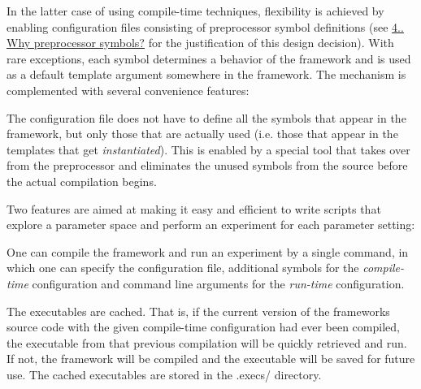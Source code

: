 In the latter case of using compile-\/time techniques, flexibility is achieved by enabling configuration files consisting of preprocessor symbol definitions (see \hyperlink{index_s-why-symbols}{4.. Why preprocessor symbols?} for the justification of this design decision). With rare exceptions, each symbol determines a behavior of the framework and is used as a default template argument somewhere in the framework. The mechanism is complemented with several convenience features\+:


\begin{DoxyItemize}
\item The configuration file does not have to define all the symbols that appear in the framework, but only those that are actually used (i.\+e. those that appear in the templates that get {\itshape instantiated}). This is enabled by a special tool that takes over from the preprocessor and eliminates the unused symbols from the source before the actual compilation begins.
\item Two features are aimed at making it easy and efficient to write scripts that explore a parameter space and perform an experiment for each parameter setting\+:
\begin{DoxyItemize}
\item One can compile the framework and run an experiment by a single command, in which one can specify the configuration file, additional symbols for the {\itshape compile-\/time} configuration and command line arguments for the {\itshape run-\/time} configuration.
\item The executables are cached. That is, if the current version of the framework\textquotesingle{}s source code with the given compile-\/time configuration had ever been compiled, the executable from that previous compilation will be quickly retrieved and run. If not, the framework will be compiled and the executable will be saved for future use. The cached executables are stored in the {\ttfamily .execs/} directory.
\end{DoxyItemize}
\end{DoxyItemize}

